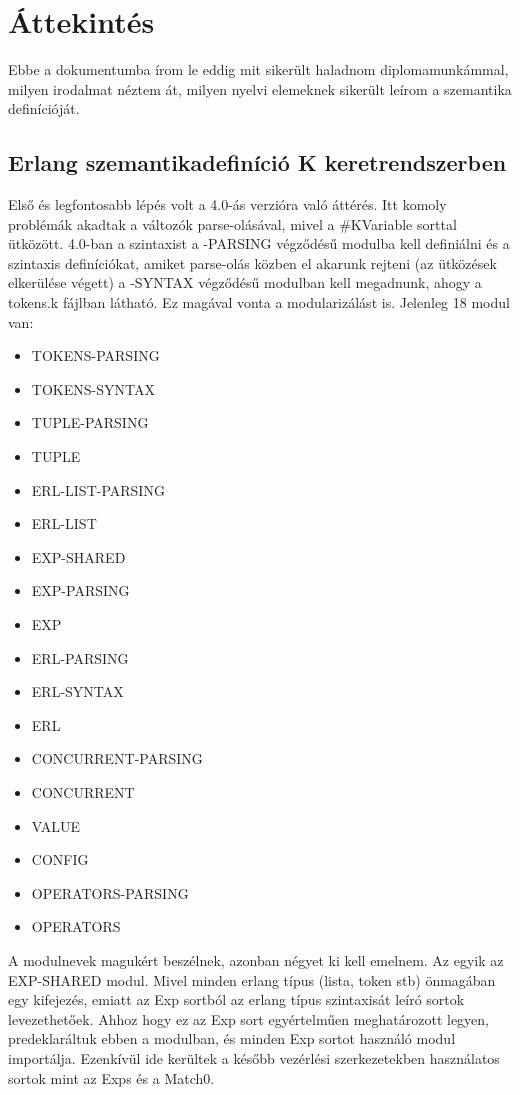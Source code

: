 \documentclass[]{article}
\begin{document}
\section*{Áttekintés}
Ebbe a dokumentumba írom le eddig mit sikerült haladnom diplomamunkámmal, milyen irodalmat néztem át, milyen nyelvi elemeknek sikerült leírom a szemantika definícióját.

\subsection*{Erlang szemantikadefiníció K keretrendszerben}
Első és legfontosabb lépés volt a 4.0-ás verzióra való áttérés. Itt komoly problémák akadtak a változók parse-olásával, mivel a \#KVariable sorttal ütközött. 4.0-ban a szintaxist a -PARSING végződésű modulba kell definiálni és a szintaxis definíciókat, amiket parse-olás közben el akarunk rejteni (az ütközések elkerülése végett) a -SYNTAX végződésű modulban kell megadnunk, ahogy a tokens.k fájlban látható. Ez magával vonta a modularizálást is. Jelenleg 18 modul van:

\begin{itemize}
  \item TOKENS-PARSING
  \item TOKENS-SYNTAX
  \item TUPLE-PARSING
  \item TUPLE
  \item ERL-LIST-PARSING
  \item ERL-LIST
  \item EXP-SHARED
  \item EXP-PARSING
  \item EXP
  \item ERL-PARSING
  \item ERL-SYNTAX
  \item ERL
  \item CONCURRENT-PARSING
  \item CONCURRENT
  \item VALUE
  \item CONFIG
  \item OPERATORS-PARSING
  \item OPERATORS
\end{itemize}

A modulnevek magukért beszélnek, azonban négyet ki kell emelnem. Az egyik az EXP-SHARED modul. Mivel minden erlang típus (lista, token stb) önmagában egy kifejezés, emiatt az Exp sortból az erlang típus szintaxisát leíró sortok levezethetőek. Ahhoz hogy ez az Exp sort egyértelműen meghatározott legyen, predeklaráltuk ebben a modulban, és minden Exp sortot használó modul importálja. Ezenkívül ide kerültek a később vezérlési szerkezetekben használatos sortok mint az Exps és a Match0.
\end{document}

